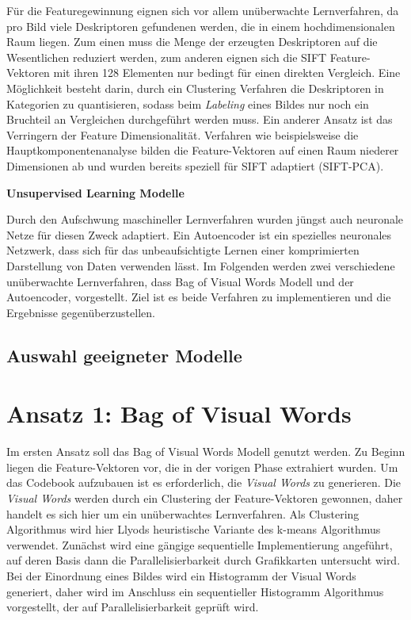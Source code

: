 Für die Featuregewinnung eignen sich vor allem unüberwachte Lernverfahren, da pro Bild viele Deskriptoren gefundenen werden, die in einem hochdimensionalen Raum liegen. Zum einen muss die Menge der erzeugten Deskriptoren auf die Wesentlichen reduziert werden, zum anderen eignen sich die SIFT Feature-Vektoren mit ihren 128 Elementen nur bedingt für einen direkten Vergleich. Eine Möglichkeit besteht darin, durch ein Clustering Verfahren die Deskriptoren in Kategorien zu quantisieren, sodass beim \textit{Labeling} eines Bildes nur noch ein Bruchteil an Vergleichen durchgeführt werden muss. Ein anderer Ansatz ist das Verringern der Feature Dimensionalität. Verfahren wie beispielsweise die Hauptkomponentenanalyse bilden die Feature-Vektoren auf einen Raum niederer Dimensionen ab und wurden bereits speziell für SIFT adaptiert (SIFT-PCA). 

\textbf{Unsupervised Learning Modelle}

Durch den Aufschwung maschineller Lernverfahren wurden jüngst auch neuronale Netze für diesen Zweck adaptiert. Ein Autoencoder ist ein spezielles neuronales Netzwerk, dass sich für das unbeaufsichtigte Lernen einer komprimierten Darstellung von Daten verwenden lässt. Im Folgenden werden zwei verschiedene unüberwachte Lernverfahren, dass Bag of Visual Words Modell und der Autoencoder, vorgestellt. Ziel ist es beide Verfahren zu implementieren und die Ergebnisse gegenüberzustellen.

\subsection{Auswahl geeigneter Modelle}


\section{Ansatz 1: Bag of Visual Words}

Im ersten Ansatz soll das Bag of Visual Words Modell genutzt werden. Zu Beginn liegen die Feature-Vektoren vor, die in der vorigen Phase extrahiert wurden. Um das Codebook aufzubauen ist es erforderlich, die \textit{Visual Words} zu generieren. Die \textit{Visual Words} werden durch ein Clustering der Feature-Vektoren gewonnen, daher handelt es sich hier um ein unüberwachtes Lernverfahren. Als Clustering Algorithmus wird hier Llyods heuristische Variante des k-means Algorithmus verwendet. Zunächst wird eine gängige sequentielle Implementierung angeführt, auf deren Basis dann die Parallelisierbarkeit durch Grafikkarten untersucht wird. Bei der Einordnung eines Bildes wird ein Histogramm der Visual Words generiert, daher wird im Anschluss ein sequentieller Histogramm Algorithmus vorgestellt, der auf Parallelisierbarkeit geprüft wird.

